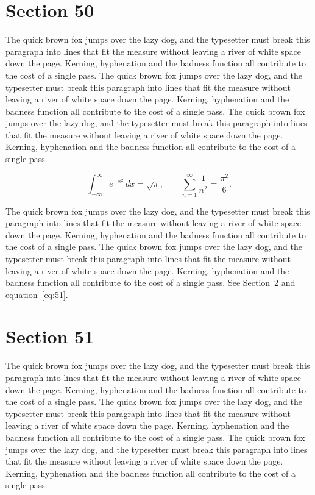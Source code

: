 \documentclass{article}
\begin{document}
\section{Section 50}
\label{sec:50}
The quick brown fox jumps over the lazy dog, and the typesetter must break this paragraph into lines that fit the measure without leaving a river of white space down the page. Kerning, hyphenation and the badness function all contribute to the cost of a single pass. The quick brown fox jumps over the lazy dog, and the typesetter must break this paragraph into lines that fit the measure without leaving a river of white space down the page. Kerning, hyphenation and the badness function all contribute to the cost of a single pass. The quick brown fox jumps over the lazy dog, and the typesetter must break this paragraph into lines that fit the measure without leaving a river of white space down the page. Kerning, hyphenation and the badness function all contribute to the cost of a single pass. 

\begin{equation}\label{eq:50}
\int_{-\infty}^{\infty} e^{-x^{2}}\,dx = \sqrt{\pi}, \qquad
\sum_{n=1}^{\infty} \frac{1}{n^{2}} = \frac{\pi^{2}}{6}.
\end{equation}

The quick brown fox jumps over the lazy dog, and the typesetter must break this paragraph into lines that fit the measure without leaving a river of white space down the page. Kerning, hyphenation and the badness function all contribute to the cost of a single pass. The quick brown fox jumps over the lazy dog, and the typesetter must break this paragraph into lines that fit the measure without leaving a river of white space down the page. Kerning, hyphenation and the badness function all contribute to the cost of a single pass. 
See Section~\ref{sec:51} and equation~\eqref{eq:51}.
\section{Section 51}
\label{sec:51}
The quick brown fox jumps over the lazy dog, and the typesetter must break this paragraph into lines that fit the measure without leaving a river of white space down the page. Kerning, hyphenation and the badness function all contribute to the cost of a single pass. The quick brown fox jumps over the lazy dog, and the typesetter must break this paragraph into lines that fit the measure without leaving a river of white space down the page. Kerning, hyphenation and the badness function all contribute to the cost of a single pass. The quick brown fox jumps over the lazy dog, and the typesetter must break this paragraph into lines that fit the measure without leaving a river of white space down the page. Kerning, hyphenation and the badness function all contribute to the cost of a single pass. 
\end{document}
